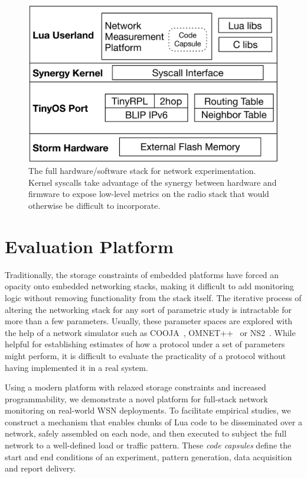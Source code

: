 \begin{figure}[t]
\centering
\includegraphics[width=.9\linewidth]{figs/NodeStack}
\caption{The full hardware/software stack for network experimentation. Kernel syscalls take advantage of the synergy between hardware and firmware to expose low-level metrics on the radio stack that would otherwise be difficult to incorporate.}
\label{fig:nodestack}
\end{figure}

\section{Evaluation Platform}

Traditionally, the storage constraints of embedded platforms have forced an opacity onto embedded networking stacks, making it difficult to add monitoring logic without removing functionality from the stack itself.
The iterative process of altering the networking stack for any sort of parametric study is intractable for more than a few parameters.
Usually, these parameter spaces are explored with the help of a network simulator such as COOJA~\cite{cooja}, OMNET++~\cite{omnet++} or NS2~\cite{ns2}.
While helpful for establishing estimates of how a protocol under a set of parameters might perform, it is difficult to evaluate the practicality of a protocol without having implemented it in a real system.

Using a modern platform with relaxed storage constraints and increased programmability, we demonstrate a novel platform for full-stack network monitoring on real-world WSN deployments.
To facilitate empirical studies, we construct a mechanism that enables chunks of Lua code to be disseminated over a network, safely assembled on each node, and then executed to subject the full network to a well-defined load or traffic pattern.
These \emph{code capsules} define the start and end conditions of an experiment, pattern generation, data acquisition and report delivery.

